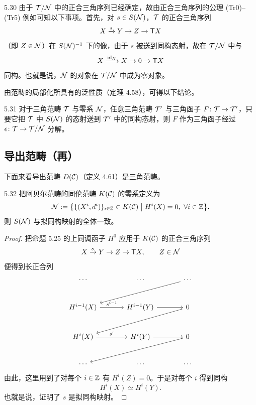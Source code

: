 \begin{remark}{5.30}
由于 $\mathcal{T}/\mathcal{N}$ 中的正合三角序列已经确定，故由正合三角序列的公理 (Tr0)–(Tr5) 例如可知以下事项。首先，对 $s\in S(\mathcal{N})$，$\mathcal{T}$ 的正合三角序列
\[
  X\xrightarrow{s}Y\to Z\to\mathsf{T} X
\]
（即 $Z\in\mathcal{N}$）在 $S(\mathcal{N})^{-1}$ 下的像，由于 $s$ 被送到同构态射，故在 $\mathcal{T}/\mathcal{N}$ 中与
\[
  X\xrightarrow{\mathrm{id}_X}X\to0\to\mathsf{T} X
\]
同构。也就是说，$\mathcal{N}$ 的对象在 $\mathcal{T}/\mathcal{N}$ 中成为零对象。
\end{remark}

由范畴的局部化所具有的泛性质（定理 4.58），可得以下结论。

\begin{corollary}{5.31}
对于三角范畴 $\mathcal{T}$ 与零系 $\mathcal{N}$，任意三角范畴 $\mathcal{T}'$ 与三角函子 $F\colon\mathcal{T}\to\mathcal{T}'$，只要它把 $\mathcal{T}$ 中 $S(\mathcal{N})$ 的态射送到 $\mathcal{T}'$ 中的同构态射，则 $F$ 作为三角函子经过 $\epsilon\colon\mathcal{T}\to\mathcal{T}/\mathcal{N}$ 分解。
\end{corollary}


\subsection{导出范畴（再）}

下面来看导出范畴 $D(\mathcal{C})$（定义 4.61）是三角范畴。

\begin{lemma}{5.32}
把阿贝尔范畴的同伦范畴 $K(\mathcal{C})$ 的零系定义为
\[
  \mathcal{N} := \bigl\{\{(X^i,d^i)\}_{i\in\mathbb{Z}}\in K(\mathcal{C})\bigm| H^i(X)=0,\ \forall i\in\mathbb{Z}\bigr\}.
\]
则 $S(\mathcal{N})$ 与拟同构映射的全体一致。
\end{lemma}

\begin{proof}
把命题 5.25 的上同调函子 $H^0$ 应用于 $K(\mathcal{C})$ 的正合三角序列
\[
  X\xrightarrow{s}Y\to Z\to\mathsf{T} X,\qquad Z\in\mathcal{N}
\]
便得到长正合列
\[\begin{tikzcd}[row sep=2.4em, column sep=3.4em]
\cdots & \cdots & \cdots \arrow[dll] \\
H^{i-1}(X) \arrow[r,"s^{i-1}"] & H^{i-1}(Y) \arrow[r] & 0 \arrow[dll] \\
H^{i}(X) \arrow[r,"s^{i}"] & H^{i}(Y) \arrow[r] & 0 \arrow[dll] \\
\cdots & \cdots & \cdots
\end{tikzcd}\]
由此，这里用到了对每个 $i\in\mathbb{Z}$ 有 $H^i(Z)=0$。于是对每个 $i$ 得到同构
\[
  H^i(X)\simeq H^i(Y).
\]
也就是说，证明了 $s$ 是拟同构映射。
\end{proof}

